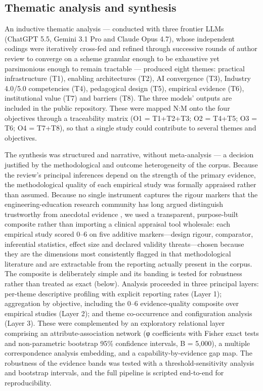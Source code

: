 \subsection{Thematic analysis and synthesis}\label{thematic-analysis-and-synthesis}

An inductive thematic analysis --- conducted with three frontier LLMs (ChatGPT 5.5,
Gemini 3.1 Pro and Claude Opus 4.7), whose independent codings were iteratively
cross-fed and refined through successive rounds of author review to converge on a
scheme granular enough to be exhaustive yet parsimonious enough to remain
tractable --- produced eight themes: practical infrastructure (T1), enabling
architectures (T2), AI convergence (T3), Industry 4.0/5.0 competencies (T4),
pedagogical design (T5), empirical evidence (T6), institutional value (T7) and
barriers (T8). The three models' outputs are included in the public repository. These were mapped N:M onto the four objectives
through a traceability matrix (O1 = T1+T2+T3; O2 = T4+T5; O3 = T6; O4 = T7+T8), so
that a single study could contribute to several themes and objectives.

The synthesis was structured and narrative, without meta-analysis --- a decision
justified by the methodological and outcome heterogeneity of the corpus. Because
the review's principal inferences depend on the strength of the primary evidence,
the methodological quality of each empirical study was formally appraised rather
than assumed. Because no single instrument captures the rigour markers that the
engineering-education research community has long argued distinguish trustworthy
from anecdotal evidence \citep{streveler_conducting_2006}, we used a transparent,
purpose-built composite rather than importing a clinical appraisal tool wholesale:
each empirical study scored 0--6 on five additive markers---design rigour,
comparator, inferential statistics, effect size and declared validity
threats---chosen because they are the dimensions most consistently flagged in that
methodological literature and are extractable from the reporting actually present
in the corpus. The composite is deliberately simple and its banding is tested for
robustness rather than treated as exact (below). Analysis proceeded in three
principal layers: per-theme descriptive profiling with explicit
reporting rates (Layer 1); aggregation by objective, including the 0--6
evidence-quality composite over empirical studies
(Layer 2); and theme co-occurrence and configuration analysis (Layer 3). These
were complemented by an exploratory relational layer comprising an
attribute-association network (φ coefficients with Fisher exact tests and
non-parametric bootstrap 95\% confidence intervals, B = 5,000), a multiple
correspondence analysis embedding, and a capability-by-evidence gap map. The
robustness of the evidence bands was tested with a threshold-sensitivity analysis
and bootstrap intervals, and the full pipeline is scripted end-to-end for
reproducibility.

